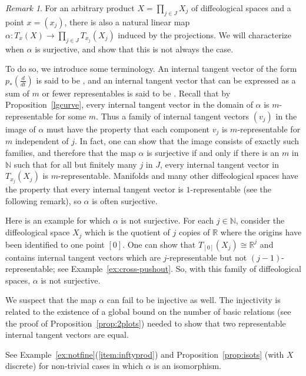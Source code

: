 \documentclass[12pt]{amsart}
\newcommand{\dfn}[1]{\textbf{\boldmath{#1}}}
\theoremstyle{remark}
\newtheorem{rem}[de]{Remark}
\newcommand{\ra}{\to}
\newcommand{\ddt}{{\textstyle\frac{d}{dt}}}
\def \N{\mathbb{N}}
\def \R{\mathbb{R}}
\begin{document}
\begin{rem}\label{rem:infinite-product}
For an arbitrary product $X = \prod_{j \in J} X_j$ of diffeological spaces
and a point $x = (x_j)$,
there is also a natural linear map $\alpha: T_x(X) \ra \prod_{j \in J} T_{x_j}(X_j)$
induced by the projections.
We will characterize when $\alpha$ is surjective, and show that this
is not always the case.

To do so, we introduce some terminology.
An internal tangent vector of the form $p_*(\ddt)$ is said to be \dfn{representable},
and an internal tangent vector that can be expressed as a sum of $m$ or fewer
representables is said to be \dfn{$m$-representable}.
Recall that by Proposition~\ref{lgcurve},
every internal tangent vector in the domain of $\alpha$ is $m$-representable for some $m$.
Thus a family of internal tangent vectors $(v_j)$ in the image of $\alpha$ must have the property that each
component $v_j$ is $m$-representable for $m$ independent of $j$.
In fact, one can show that the image consists of exactly such families,
and therefore that the map $\alpha$ is surjective if and only if
there is an $m$ in $\N$ such that for all but finitely many $j$ in $J$,
every internal tangent vector in $T_{x_j}(X_j)$ is $m$-representable.
Manifolds and many other diffeological spaces have the property that
every internal tangent vector is $1$-representable (see the following remark),
so $\alpha$ is often surjective.

Here is an example for which $\alpha$ is not surjective.
For each $j \in \N$, consider the diffeological space $X_j$ which is
the quotient of $j$ copies of $\R$ where the origins have been identified
to one point $[0]$.  One can show that $T_{[0]}(X_j) \cong \R^{j}$ and contains internal tangent
vectors which are $j$-representable but not $(j-1)$-representable; see Example~\ref{ex:cross-pushout}.
So, with this family of diffeological spaces, $\alpha$ is not surjective.

We suspect that the map $\alpha$ can fail to be injective as well.  The injectivity
is related to the existence of a global bound on the number of basic relations
(see the proof of Proposition~\ref{prop:2plots}) needed to show that
two representable internal tangent vectors are equal.
%

See Example~\ref{ex:notfine}(\ref{item:inftyprod}) and Proposition~\ref{prop:isots} (with $X$ discrete)
for non-trivial cases in which $\alpha$ is an isomorphism.
\end{rem}
\end{document}
